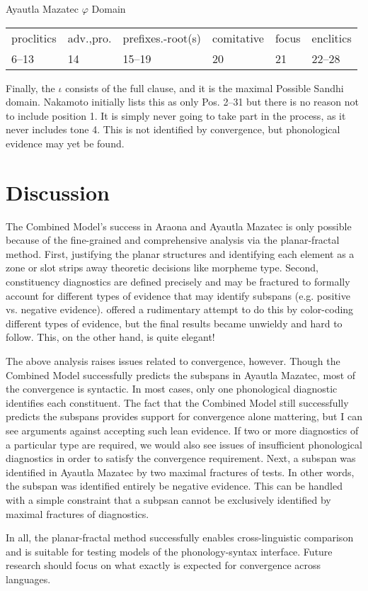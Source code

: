 \documentclass[output=paper]{langscibook}
\begin{document}
\ea
    Ayautla Mazatec $\varphi$ Domain \\
        \begin{tabular}{llllll}
            proclitics & adv.,pro. & prefixes.-root(s) & comitative & focus & enclitics  \\
            6--13 & 14 & 15--19 & 20 & 21 & 22--28 
        \end{tabular}
\z

Finally, the $\iota$ consists of the full clause, and it is the maximal Possible Sandhi domain. Nakamoto initially lists this as only Pos. 2--31 but there is no reason not to include position 1. It is simply never going to take part in the process, as it never includes tone 4. This is not identified by convergence, but phonological evidence may yet be found.

\section{Discussion}
The Combined Model's success in Araona and Ayautla Mazatec is only possible because of the fine-grained and comprehensive analysis via the planar-fractal method. First, justifying the planar structures and identifying each element as a zone or slot strips away theoretic decisions like morpheme type. Second, constituency diagnostics are defined precisely and may be fractured to formally account for different types of evidence that may identify subspans (e.g. positive vs. negative evidence). \citet{Miller:2018} offered a rudimentary attempt to do this by color-coding different types of evidence, but the final results became unwieldy and hard to follow. This, on the other hand, is quite elegant!

The above analysis raises issues related to convergence, however. Though the Combined Model successfully predicts the subspans in Ayautla Mazatec, most of the convergence is syntactic. In most cases, only one phonological diagnostic identifies each constituent. The fact that the Combined Model still successfully predicts the subspans provides support for convergence alone mattering, but I can see arguments against accepting such lean evidence. If two or more diagnostics of a particular type are required, we would also see issues of insufficient phonological diagnostics in order to satisfy the convergence requirement. Next, a subspan was identified in Ayautla Mazatec by two maximal fractures of tests. In other words, the subspan was identified entirely be negative evidence. This can be handled with a simple constraint that a subpsan cannot be exclusively identified by maximal fractures of diagnostics. 

In all, the planar-fractal method successfully enables cross-linguistic comparison and is suitable for testing models of the phonology-syntax interface. Future research should focus on what exactly is expected for convergence across languages.


\printbibliography[heading=subbibliography,notkeyword=this]
\end{document}
